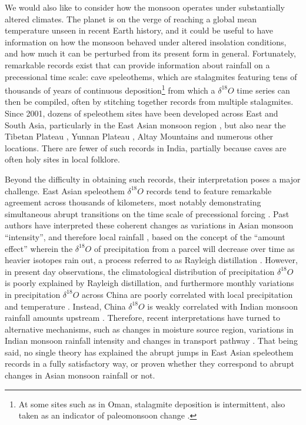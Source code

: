 	We would also like to consider how the monsoon operates under substantially altered climates. The planet is on the verge of reaching a global mean temperature unseen in recent Earth history, and it could be useful to have information on how the monsoon behaved under altered insolation conditions, and how much it can be perturbed from its present form in general. Fortunately, remarkable records exist that can provide information about rainfall on a precessional time scale: cave speleothems, which are stalagmites featuring tens of thousands of years of continuous deposition\footnote{At some sites such as in Oman, stalagmite deposition is intermittent, also taken as an indicator of paleomonsoon change \citep{Burns2001,Fleitmann2003}.} from which a $\delta ^{18}O$ time series can then be compiled, often by stitching together records from multiple stalagmites. Since 2001, dozens of speleothem sites have been developed across East and South Asia, particularly in the East Asian monsoon region \citep{Wang2001,Dykoski2005,Wang2008b}, but also near the Tibetan Plateau \citep{Cai2010b}, Yunnan Plateau \citep{Cai2015}, Altay Mountains\citep{Cheng2012} and numerous other locations. There are fewer of such records in India, partially because caves are often holy sites in local folklore.
	
	Beyond the difficulty in obtaining such records, their interpretation poses a major challenge. East Asian speleothem $\delta ^{18}O$ records tend to feature remarkable agreement across thousands of kilometers, most notably demonstrating simultaneous abrupt transitions on the time scale of precessional forcing \citep{Chiang2015}. Past authors have interpreted these coherent changes as variations in Asian monsoon ``intensity'', and therefore local rainfall \citep{Wang2001,Liu2014}, based on the concept of the ``amount effect'' wherein the $\delta ^{18}O$ of precipitation from a parcel will decrease over time as heavier isotopes rain out, a process referred to as Rayleigh distillation \citep{Dansgaard1964}. However, in present day observations, the climatological distribution of precipitation $\delta ^{18}O$ is poorly explained by Rayleigh distillation, and furthermore monthly variations in precipitation $\delta ^{18}O$ across China are poorly correlated with local precipitation and temperature \citep{Dayem2010,Lee2012}. Instead, China $\delta ^{18}O$ is weakly correlated with Indian monsoon rainfall amounts upstream \citep{Lee2012}. Therefore, recent interpretations have turned to alternative mechanisms, such as changes in moisture source region, variations in Indian monsoon rainfall intensity and changes in transport pathway \citep{Maher2008,Dayem2010,Pausata2011,Baker2015}. That being said, no single theory has explained the abrupt jumps in East Asian speleothem records in a fully satisfactory way, or proven whether they correspond to abrupt changes in Asian monsoon rainfall or not.
	
